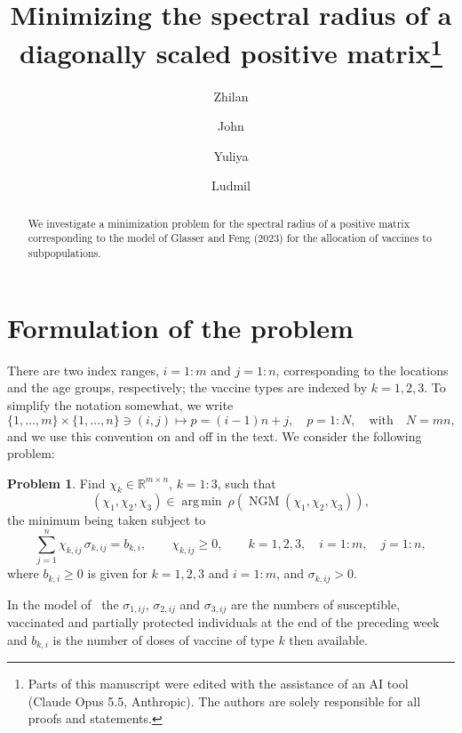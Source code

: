 \documentclass[11pt]{article}
\title{Minimizing the spectral radius of a diagonally scaled positive matrix\thanks{Parts of this manuscript were edited with the assistance of an AI tool (Claude Opus 5.5, Anthropic). The authors are solely responsible for all proofs and statements.}}
\author{Zhilan \and John \and Yuliya \and Ludmil}
\date{}
\theoremstyle{plain}
\theoremstyle{definition}
\newtheorem{problem}[theorem]{Problem}
\theoremstyle{remark}
\numberwithin{equation}{section}
\numberwithin{figure}{section}
\numberwithin{table}{section}
\begin{document}
\maketitle

\begin{abstract}
    We investigate a minimization problem for the spectral radius of a positive matrix corresponding to the model of Glasser and Feng (2023) for the allocation of vaccines to subpopulations.
\end{abstract}

\section{Formulation of the problem}\label{sec-ngm}


There are two index ranges, $i=1:m$ and $j=1:n$, corresponding to the locations and the age groups, respectively; the vaccine types are indexed by $k=1,2,3$.
To simplify the notation somewhat, we write
\begin{equation}\label{flat-index}
\{1,\ldots,m\}\times\{1,\ldots,n\}\ni (i,j)\mapsto p=(i-1)n+j,\quad p=1:N, \quad\mbox{with}\quad N=mn,
\end{equation}
and we use this convention on and off in the text. We consider the following problem:

\begin{problem}\label{ngm-problem}
Find $\chi_k\in\mathbb{R}^{m\times n}$, $k=1:3$, such that
\begin{equation}\label{the-min}
\left(\chi_1,\chi_2,\chi_3\right)
\in\operatorname*{arg\,min}\ \rho\left(\operatorname{NGM}(\chi_1,\chi_2,\chi_3)\right),
\end{equation}
the minimum being taken subject to
\begin{equation}\label{constraints}
\sum_{j=1}^{n}\chi_{k,ij}\,\sigma_{k,ij}=b_{k,i},\qquad \chi_{k,ij}\ge 0,
\qquad k=1,2,3,\quad i=1:m,\quad j=1:n ,
\end{equation}
where $b_{k,i}\ge 0$ is given for $k=1,2,3$ and $i=1:m$, and
$\sigma_{k,ij}>0$.
\end{problem}
In the model of~\cite{JZh} the $\sigma_{1,ij}$, $\sigma_{2,ij}$ and $\sigma_{3,ij}$ are
the numbers of susceptible, vaccinated and partially protected individuals at
the end of the preceding week and $b_{k,i}$ is the number of doses of vaccine of
type $k$ then available.
\end{document}
